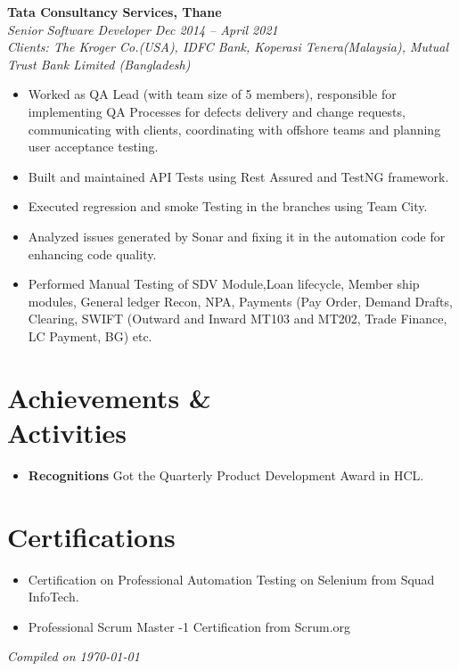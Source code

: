 \documentclass[margin,line]{resume}
\begin{document}
\begin{resume}
    \textbf{Tata Consultancy Services, Thane}\\
           \textsl{Senior Software Developer} \hfill \textsl{Dec 2014 -- April 2021} \vspace{0mm}\\\vspace{0mm}%
           \textsl{Clients: The Kroger Co.(USA), IDFC Bank, Koperasi Tenera(Malaysia), Mutual Trust Bank Limited (Bangladesh)} \hfill  \vspace{0mm}\\\vspace{0mm}%
    \begin{itemize}
            \item Worked as QA Lead (with team size of 5 members), responsible for implementing QA Processes for defects delivery  and change requests, communicating with clients, coordinating with offshore teams and planning user acceptance testing.
            \item Built and maintained API Tests using Rest Assured and TestNG framework.
            \item Executed regression and smoke Testing in the branches
using Team City.
            \item Analyzed issues generated by Sonar and fixing it in the automation code for enhancing code quality.
            \item Performed Manual Testing of SDV Module,Loan lifecycle, Member ship modules, General ledger Recon, NPA, Payments (Pay Order, Demand Drafts, Clearing, SWIFT (Outward and Inward MT103 and MT202, Trade Finance, LC Payment, BG) etc.
       \end{itemize}
    
\section{\mysidestyle Achievements \& \\ Activities}
\vspace{0mm}
    \begin{itemize}
            \item \textbf{Recognitions} \vspace{0mm}
                \subitem Got the Quarterly Product Development Award in HCL.
    \end{itemize}

\section{\mysidestyle Certifications}
\vspace{0mm}
    \begin{itemize}
        \item Certification on Professional Automation Testing on Selenium from Squad InfoTech.
        \item Professional Scrum Master -1 Certification from Scrum.org
    \end{itemize}
\hfill \textsl{Compiled on \monthyeardate\today}
\end{resume}
\end{document}
